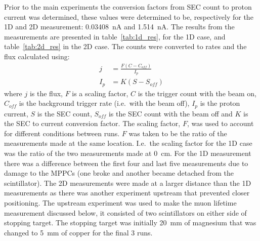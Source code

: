 Prior to the main experiments the conversion factors from SEC count to proton current was determined, these values were determined to be, respectively for the 1D and 2D measurement: 0.03408~nA and 1.514~nA. The results from the measurements are presented in table~\ref{tab:1d_res}, for the 1D case, and table~\ref{tab:2d_res} in the 2D case. The counts were converted to rates and the flux calculated using:
\begin{align}
  j &= \frac{F(C - C_{off})}{I_{p}} \\
  I_{p} &= K(S - S_{off})
\end{align}
where \(j\) is the flux, \(F\) is a scaling factor, \(C\) is the trigger count with the beam on, \(C_{off}\) is the background trigger rate (i.e.\ with the beam off), \( I_{p} \) is the proton current, \(S\) is the SEC count, \(S_{off}\) is the SEC count with the beam off and \(K\) is the SEC to current conversion factor. The scaling factor, \(F\), was used to account for different conditions between runs. \(F\) was taken to be the ratio of the measurements made at the same location. I.e.\ the scaling factor for the 1D case was the ratio of the two measurements made at 0~cm. For the 1D measurement there was a difference between the first four and last five measurements due to damage to the MPPCs (one broke and another became detached from the scintillator). The 2D measurements were made at a larger distance than the 1D measurements as there was another experiment upstream that prevented closer positioning. The upstream experiment was used to make the muon lifetime measurement discussed below, it consisted of two scintillators on either side of stopping target. The stopping target was initially 20~mm of magnesium that was changed to 5~mm of copper for the final 3 runs.


